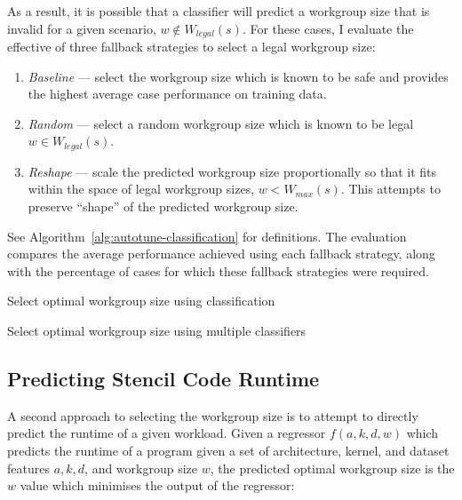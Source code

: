 As a result, it is possible that a classifier will predict a workgroup
size that is invalid for a given scenario, $w \not\in W_{legal}(s)$.
For these cases, I evaluate the effective of three fallback strategies
to select a legal workgroup size:

\begin{enumerate}
\item \emph{Baseline} --- select the workgroup size which is known to
  be safe and provides the highest average case performance on
  training data.
\item \emph{Random} --- select a random workgroup size which is known
  to be legal $w \in W_{legal}(s)$.
\item \emph{Reshape} --- scale the predicted workgroup size
  proportionally so that it fits within the space of legal workgroup
  sizes, $w < W_{max}(s)$. This attempts to preserve ``shape'' of the
  predicted workgroup size.
\end{enumerate}

See Algorithm~\ref{alg:autotune-classification} for definitions. The
evaluation compares the average performance achieved using each
fallback strategy, along with the percentage of cases for which these
fallback strategies were required.


\begin{algorithm}

\caption{Select optimal workgroup size using classification}
\label{alg:autotune-classification}
\end{algorithm}


\begin{algorithm}

\caption{Select optimal workgroup size using multiple classifiers}
\label{alg:autotune-classification2}
\end{algorithm}



\subsection{Predicting Stencil Code Runtime}

 A second approach to selecting the
workgroup size is to attempt to directly predict the runtime of a
given workload. Given a regressor $f(a,k,d,w)$ which predicts the
runtime of a program given a set of architecture, kernel, and dataset
features $a,k,d$, and workgroup size $w$, the predicted optimal
workgroup size is the $w$ value which minimises the output of the
regressor:

